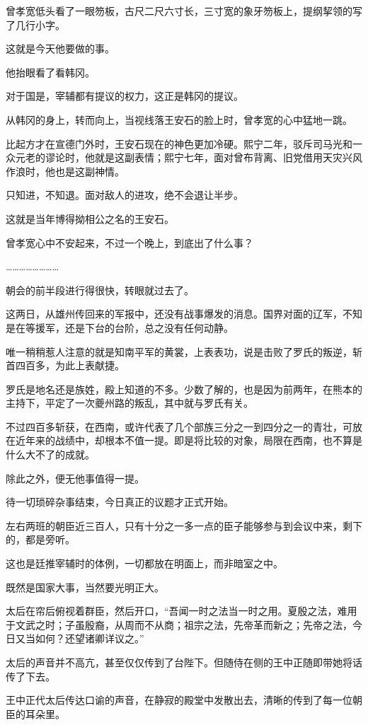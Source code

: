 曾孝宽低头看了一眼笏板，古尺二尺六寸长，三寸宽的象牙笏板上，提纲挈领的写了几行小字。

这就是今天他要做的事。

他抬眼看了看韩冈。

对于国是，宰辅都有提议的权力，这正是韩冈的提议。

从韩冈的身上，转而向上，当视线落王安石的脸上时，曾孝宽的心中猛地一跳。

比起方才在宣德门外时，王安石现在的神色更加冷硬。熙宁二年，驳斥司马光和一众元老的谬论时，他就是这副表情；熙宁七年，面对曾布背离、旧党借用天灾兴风作浪时，他也是这副神情。

只知进，不知退。面对敌人的进攻，绝不会退让半步。

这就是当年博得拗相公之名的王安石。

曾孝宽心中不安起来，不过一个晚上，到底出了什么事？

……………………

朝会的前半段进行得很快，转眼就过去了。

这两日，从雄州传回来的军报中，还没有战事爆发的消息。国界对面的辽军，不知是在等援军，还是下台的台阶，总之没有任何动静。

唯一稍稍惹人注意的就是知南平军的黄裳，上表表功，说是击败了罗氏的叛逆，斩首四百多，为此上表献捷。

罗氏是地名还是族姓，殿上知道的不多。少数了解的，也是因为前两年，在熊本的主持下，平定了一次夔州路的叛乱，其中就与罗氏有关。

不过四百多斩获，在西南，或许代表了几个部族三分之一到四分之一的青壮，可放在近年来的战绩中，却根本不值一提。即是将比较的对象，局限在西南，也不算是什么大不了的成就。

除此之外，便无他事值得一提。

待一切琐碎杂事结束，今日真正的议题才正式开始。

左右两班的朝臣近三百人，只有十分之一多一点的臣子能够参与到会议中来，剩下的，都是旁听。

这也是廷推宰辅时的体例，一切都放在明面上，而非暗室之中。

既然是国家大事，当然要光明正大。

太后在帘后俯视着群臣，然后开口，“吾闻一时之法当一时之用。夏殷之法，难用于文武之时；子虽殷裔，从周而不从商；祖宗之法，先帝革而新之；先帝之法，今日又当如何？还望诸卿详议之。”

太后的声音并不高亢，甚至仅仅传到了台陛下。但随侍在侧的王中正随即带她将话传了下去。

王中正代太后传达口谕的声音，在静寂的殿堂中发散出去，清晰的传到了每一位朝臣的耳朵里。

